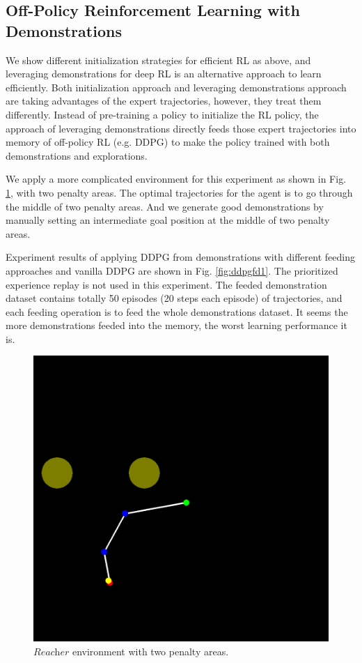 \documentclass{article}
\begin{document}
\subsection{Off-Policy Reinforcement Learning with Demonstrations}
We show different initialization strategies for efficient RL as above, and leveraging demonstrations for deep RL is an alternative approach to learn efficiently. Both initialization approach and leveraging demonstrations approach are taking advantages of the expert trajectories, however, they treat them differently. Instead of pre-training a policy to initialize the RL policy, the approach of leveraging demonstrations directly feeds those expert trajectories into memory of off-policy RL (e.g. DDPG) to make the policy trained with both demonstrations and explorations.

We apply a more complicated environment for this experiment as shown in Fig. \ref{fig:ddpgfd0}, with two penalty areas. The optimal trajectories for the agent is to go through the middle of two penalty areas. And we generate good demonstrations by manually setting an intermediate goal position at the middle of two penalty areas.

Experiment results of applying DDPG from demonstrations with different feeding approaches and vanilla DDPG are shown in Fig. \ref{fig:ddpgfd1}.  The prioritized experience replay is not used in this experiment. The feeded demonstration dataset contains totally 50 episodes (20 steps each episode) of trajectories, and each feeding operation is to feed the whole demonstrations dataset. It seems the more demonstrations feeded into the memory, the worst learning performance it is.
\begin{figure}[htbp]
	\centering
	\includegraphics[scale=0.3]{img/ddpgfd_env.png}
	\caption{$\textit{Reacher}$ environment with two penalty areas.}
	\label{fig:ddpgfd0}
\end{figure}
\end{document}
